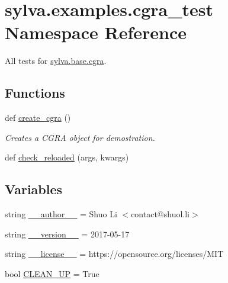 \hypertarget{namespacesylva_1_1examples_1_1cgra__test}{}\section{sylva.\+examples.\+cgra\+\_\+test Namespace Reference}
\label{namespacesylva_1_1examples_1_1cgra__test}


All tests for \hyperlink{namespacesylva_1_1base_1_1cgra}{sylva.\+base.\+cgra}.  


\subsection*{Functions}
\begin{DoxyCompactItemize}
\item 
def \hyperlink{namespacesylva_1_1examples_1_1cgra__test_a09c07ec774ca38d6416db7161605fff9}{create\+\_\+cgra} ()
\begin{DoxyCompactList}\small\item\em Creates a C\+G\+RA object for demostration. \end{DoxyCompactList}\item 
def \hyperlink{namespacesylva_1_1examples_1_1cgra__test_a880e21c8ab7a79e7bb6d726fd3f8a584}{check\+\_\+reloaded} (args, kwargs)
\end{DoxyCompactItemize}
\subsection*{Variables}
\begin{DoxyCompactItemize}
\item 
string \hyperlink{namespacesylva_1_1examples_1_1cgra__test_af0a0ac0774f042da48d4262f540947b4}{\+\_\+\+\_\+author\+\_\+\+\_\+} = \textquotesingle{}Shuo Li $<$contact@shuol.\+li$>$\textquotesingle{}
\item 
string \hyperlink{namespacesylva_1_1examples_1_1cgra__test_a9dc11bff2d2879639cdf495201053afe}{\+\_\+\+\_\+version\+\_\+\+\_\+} = \textquotesingle{}2017-\/05-\/17\textquotesingle{}
\item 
string \hyperlink{namespacesylva_1_1examples_1_1cgra__test_ac2b8da2af9322486035b2cc86e744901}{\+\_\+\+\_\+license\+\_\+\+\_\+} = \textquotesingle{}https\+://opensource.\+org/licenses/M\+IT\textquotesingle{}
\item 
bool \hyperlink{namespacesylva_1_1examples_1_1cgra__test_a4aa5407cdee8bd26aa422bbd1c60b2b4}{C\+L\+E\+A\+N\+\_\+\+UP} = True
\end{DoxyCompactItemize}


